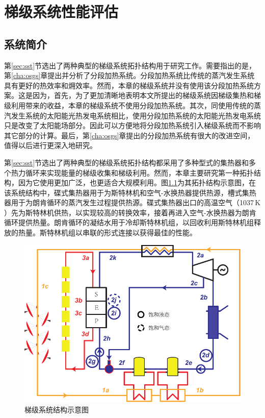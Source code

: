 \chapter{梯级系统性能评估}
\section{系统简介}

第\ref{sec:sst}节选出了两种典型的梯级系统拓扑结构用于研究工作。需要指出的是，第\ref{cha:osgs}章提出并分析了分段加热系统。分段加热系统比传统的蒸汽发生系统具有更好的热效率和㶲效率。然而，本章的梯级系统并没有使用该分段加热系统方案。这是因为，首先，为了更加清晰地表明本文所提出的梯级系统因梯级集热和梯级利用带来的收益，本章的梯级系统不使用分段加热系统。其次，同使用传统的蒸汽发生系统的太阳能光热发电系统相比，使用分段加热系统的太阳能光热发电系统只是改变了太阳能场部分。因此可以方便地将分段加热系统引入梯级系统而不影响其它部分的计算。最后，第\ref{cha:osgs}章提出的分段加热系统有很大的改进空间，值得以后进行更深入地研究。

第\ref{sec:sst}节选出了两种典型的梯级系统拓扑结构都采用了多种型式的集热器和多个热力循环来实现能量的梯级收集和梯级利用。然而，本章主要研究第一种拓扑结构，因为它使用更加广泛，也更适合大规模利用。图\ref{fig:System-1}为其拓扑结构示意图，在该系统结构中，碟式集热器用于为斯特林机和空气-水换热器提供热源，槽式集热器用于为朗肯循环的蒸汽发生过程提供热源。碟式集热器出口的高温空气（1037$\,\mathrm{K}$）先为斯特林机供热，以实现较高的转换效率，接着再进入空气-水换热器为朗肯循环提供热量。朗肯循环的凝结水用于冷却斯特林机组，以回收利用斯特林机组释放的热量。斯特林机组以串联的形式连接以获得最佳的性能。

\noindent \begin{figure}[htbp]
\begin{center}
	\includegraphics[width = 0.8\columnwidth]{fig/cascadeSystem}
	\caption{梯级系统结构示意图}
	\label{fig:System-1}
\end{center}
\end{figure}

